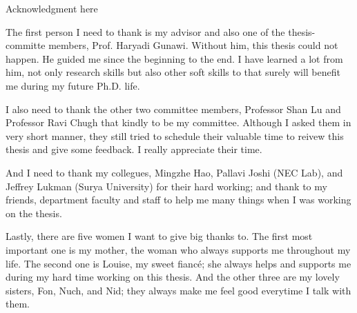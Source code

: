 Acknowledgment here

The first person I need to thank is my advisor and also one of the
thesis-committe members, Prof. Haryadi Gunawi. Without him, this thesis could
not happen. He guided me since the beginning to the end.  I have learned a lot
from him, not only research skills but also other soft skills to that surely will
benefit me during my future Ph.D. life. 

I also need to thank the other two committee members, Professor Shan Lu and
Professor Ravi Chugh that kindly to be my committee. Although I asked them in
very short manner, they still tried to schedule their valuable time to reivew
this thesis and give some feedback. I really appreciate their time.

And I need to thank my collegues, Mingzhe Hao, Pallavi Joshi (NEC Lab), and
Jeffrey Lukman (Surya University) for their hard working; and thank to my
friends, department faculty and staff to help me many things when I was working
on the thesis.

Lastly, there are five women I want to give big thanks to. The first most
important one is my mother, the woman who always supports me throughout my life.
The second one is Louise, my sweet fianc\'e; she always helps and supports me
during my hard time working on this thesis. And the other three are my lovely
sisters, Fon, Nuch, and Nid; they always make me feel good everytime I talk with
them.
\fi
